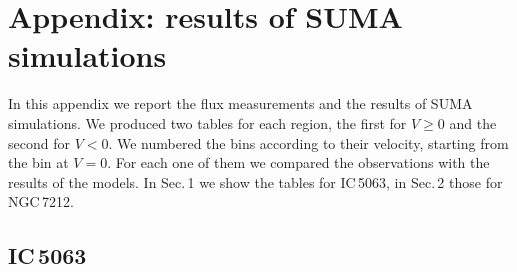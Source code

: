 \documentclass[../thesis.tex]{subfiles}
\begin{document}
\chapter{Appendix: results of SUMA simulations}
\label{cap:appendix2}

In this appendix we report the flux measurements and the results of SUMA simulations.
We produced two tables for each region, the first for $V\ge0$ and the second for $V<0$.
We numbered the bins according to their velocity, starting from the bin at $V=0$.
For each one of them we compared the observations with the results of the models.
In Sec.\,1 we show the tables for IC\,5063, in Sec.\,2 those for NGC\,7212. 

\section{IC\,5063}
\end{document}
